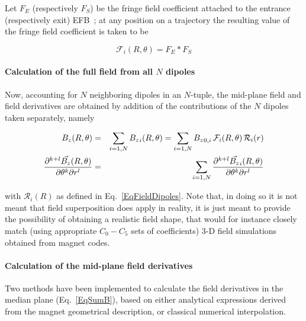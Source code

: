 \smallskip

\noindent Let $ F_E $ (respectively $ F_S$)  be the fringe field
coefficient attached to the entrance (respectively exit) EFB~; at any position on  a 
trajectory the resulting value of the fringe field coefficient is taken to be 

\begin{equation}
\label{EqFFdips}
  \mathcal{F}_i(R,\theta) = F_E  \ast  F_S 
\end{equation}



\paragraph{Calculation of the full field from all $N$ dipoles \label{FFatAP}}

 
\noindent Now, accounting for   $N$ neighboring dipoles in an $N$-tuple,  the mid-plane field  and field derivatives  
are  obtained by addition of  the  contributions of the $N$ dipoles taken separately, namely

\begin{eqnarray}
\label{EqSumB}
{B_z}(R,\theta) &=&  \sum_{i=1,N} {B_z}_i(R,\theta)   =  \sum_{i=1,N} {B_z}_{0,i} \, \mathcal{F}_i(R,\theta) 
\,  \mathcal{R}_i(r)  \nonumber \\
\frac{\partial^{ k+l}\vec {{B_z}}(R,\theta) }{ \partial \theta^k\partial r^l} &=&  \sum_{i=1,N} 
\frac{\partial^{ k+l}\vec {{B_z}}_i(R,\theta) }{ \partial \theta^k\partial r^l} 
\end{eqnarray}

\noindent with $\mathcal{R}_i(R)$ as defined in Eq.~\ref{EqFieldDipoles}. 
Note that, in doing so it is not meant that field superposition  does apply 
in reality, it is just meant to provide the possibility 
of obtaining a realistic  field shape, that would for instance closely match (using appropriate $C_0-C_5$ sets 
of coefficients) 3-D  field simulations obtained from magnet codes. 


\bigskip




\paragraph{Calculation of the  mid-plane field derivatives}

\noindent Two  methods have been implemented to calculate the field derivatives in the median 
plane (Eq.~\ref{EqSumB}), based on 
 either analytical expressions derived from the magnet geometrical description,  or  classical numerical interpolation. 
 

